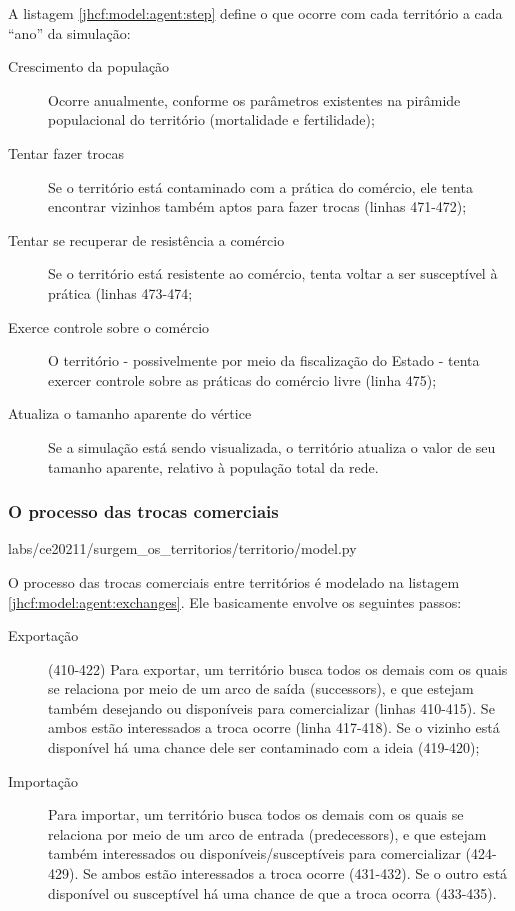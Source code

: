 A listagem \ref{jhcf:model:agent:step} define o que ocorre com cada território a cada ``ano'' da simulação:
\begin{description}
\item [Crescimento da população] Ocorre anualmente, conforme os parâmetros existentes na pirâmide populacional do território (mortalidade e fertilidade);
\item [Tentar fazer trocas] Se o território está contaminado com a prática do comércio, ele tenta encontrar vizinhos também aptos para fazer trocas (linhas 471-472);
\item [Tentar se recuperar de resistência a comércio] Se o território está resistente ao comércio, tenta voltar a ser susceptível à prática (linhas 473-474;
\item [Exerce controle sobre o comércio] O território - possivelmente por meio da fiscalização do Estado - tenta exercer controle sobre as práticas do comércio livre (linha 475);
\item [Atualiza o tamanho aparente do vértice] Se a simulação está sendo visualizada, o território atualiza o valor de seu tamanho aparente, relativo à população total da rede.
\end{description}

\subsubsection{O processo das trocas comerciais}


{labs/ce20211/surgem_os_territorios/territorio/model.py}

O processo das trocas comerciais entre territórios é modelado na listagem \ref{jhcf:model:agent:exchanges}. Ele basicamente envolve os seguintes passos:
\begin{description}
\item [Exportação] (410-422) Para exportar, um território busca todos os demais com os quais se relaciona por meio de um arco de saída (successors), e que estejam também desejando ou disponíveis para comercializar (linhas 410-415). Se ambos estão interessados a troca ocorre (linha 417-418). Se o vizinho está disponível há uma chance dele ser contaminado com a ideia (419-420);
\item [Importação] Para importar, um território busca todos os demais com os quais se relaciona por meio de um arco de entrada (predecessors), e que estejam também interessados ou disponíveis/susceptíveis para comercializar (424-429). Se ambos estão interessados a troca ocorre (431-432). Se o outro está disponível ou susceptível há uma chance de que a troca ocorra (433-435).
\end{description}


